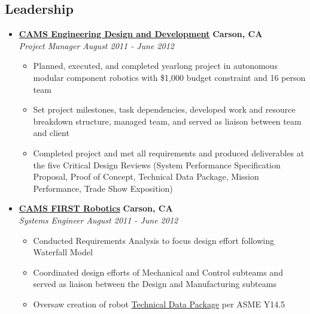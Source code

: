\documentclass[10pt,letterpaper]{article}
\begin{document}
\subsection*{Leadership}
  \begin{itemize}
    \parskip=-0.1em
    
    \item[]
    {\href{http://vincentkee.wordpress.com/edd/}{\textbf{CAMS Engineering Design and Development}} \hfill
      \textbf{Carson, CA}}
    \\
    {\emph{Project Manager} \hfill \emph{August 2011 - June 2012}}

    \begin{itemize}[label=\textbullet]
      \itemsep0em
      \item Planned, executed, and completed yearlong project in autonomous modular component robotics with \$1,000 budget constraint and 16 person team
      \item Set project milestones, task dependencies, developed work and resource breakdown structure, managed team, and served as liaison between team and client
      \item Completed project and met all requirements and produced deliverables at the five Critical Design Reviews (System Performance Specification Proposal, Proof of Concept, Technical Data Package, Mission Performance, Trade Show Exposition)    
      \end{itemize}

    \item[]
    {\href{http://camsrobotics.org/}{\textbf{CAMS FIRST Robotics}} \hfill
      \textbf{Carson, CA}}
    \\
    {\emph{Systems Engineer} \hfill \emph{August 2011 - June 2012}}

    \begin{itemize}[label=\textbullet]
      \itemsep0em
      \item Conducted Requirements Analysis to focus design effort following Waterfall Model      
      \item Coordinated design efforts of Mechanical and Control subteams and served as liaison between the Design and Manufacturing subteams 
      \item Oversaw creation of robot \href{http://vincentkee.files.wordpress.com/2012/11/687-tdp-2012-rebound-rumble.pdf}{Technical Data Package} per ASME Y14.5
    \end{itemize}


\end{itemize}
\end{document}
